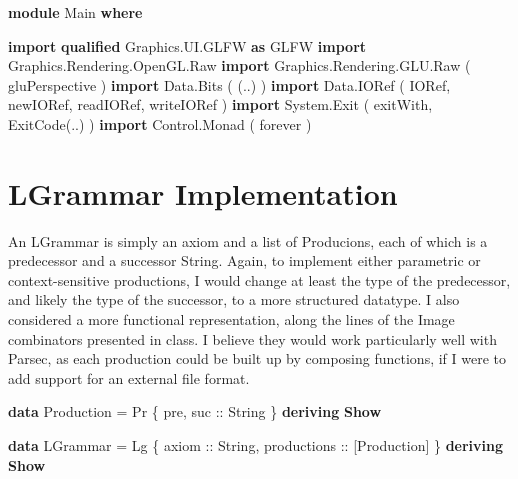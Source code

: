 \documentclass[]{article}
\newenvironment{Shaded}{}{}
\newcommand{\KeywordTok}[1]{\textcolor[rgb]{0.00,0.44,0.13}{\textbf{{#1}}}}
\newcommand{\DataTypeTok}[1]{\textcolor[rgb]{0.56,0.13,0.00}{{#1}}}
\newcommand{\OtherTok}[1]{\textcolor[rgb]{0.00,0.44,0.13}{{#1}}}
\newcommand{\FunctionTok}[1]{\textcolor[rgb]{0.02,0.16,0.49}{{#1}}}
\newcommand{\NormalTok}[1]{{#1}}
\begin{document}
\begin{Shaded}
\begin{Highlighting}[]
\KeywordTok{module} \DataTypeTok{Main}
\KeywordTok{where}
\end{Highlighting}
\end{Shaded}
\begin{Shaded}
\begin{Highlighting}[]
\KeywordTok{import} \KeywordTok{qualified} \DataTypeTok{Graphics.UI.GLFW} \KeywordTok{as} \DataTypeTok{GLFW}
\KeywordTok{import} \DataTypeTok{Graphics.Rendering.OpenGL.Raw}
\KeywordTok{import} \DataTypeTok{Graphics.Rendering.GLU.Raw} \NormalTok{( gluPerspective )}
\KeywordTok{import} \DataTypeTok{Data.Bits} \NormalTok{( (}\FunctionTok{.\textbar{}.}\NormalTok{) )}
\KeywordTok{import} \DataTypeTok{Data.IORef} \NormalTok{( }\DataTypeTok{IORef}\NormalTok{, newIORef, readIORef, writeIORef )}
\KeywordTok{import} \DataTypeTok{System.Exit} \NormalTok{( exitWith, }\DataTypeTok{ExitCode}\NormalTok{(}\FunctionTok{..}\NormalTok{) )}
\KeywordTok{import} \DataTypeTok{Control.Monad} \NormalTok{( forever )}
\end{Highlighting}
\end{Shaded}
\section{LGrammar Implementation}

An LGrammar is simply an axiom and a list of Producions, each of which
is a predecessor and a successor String. Again, to implement either
parametric or context-sensitive productions, I would change at least the
type of the predecessor, and likely the type of the successor, to a more
structured datatype. I also considered a more functional representation,
along the lines of the Image combinators presented in class. I believe
they would work particularly well with Parsec, as each production could
be built up by composing functions, if I were to add support for an
external file format.

\begin{Shaded}
\begin{Highlighting}[]
\KeywordTok{data} \DataTypeTok{Production} \FunctionTok{=} \DataTypeTok{Pr} \NormalTok{\{ pre,}\OtherTok{ suc  ::} \DataTypeTok{String} \NormalTok{\}}
                  \KeywordTok{deriving} \KeywordTok{Show}
\end{Highlighting}
\end{Shaded}
\begin{Shaded}
\begin{Highlighting}[]
\KeywordTok{data} \DataTypeTok{LGrammar}   \FunctionTok{=} \DataTypeTok{Lg} \NormalTok{\{}\OtherTok{ axiom       ::} \DataTypeTok{String}\NormalTok{,}
\OtherTok{                       productions ::} \NormalTok{[}\DataTypeTok{Production}\NormalTok{] \}}
                  \KeywordTok{deriving} \KeywordTok{Show}
\end{Highlighting}
\end{Shaded}
\end{document}

